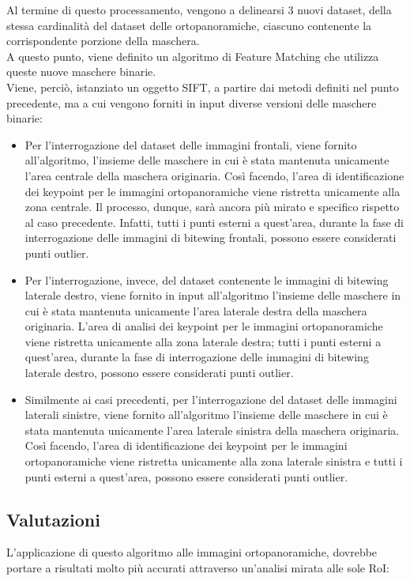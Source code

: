 \documentclass[12pt,a4paper,openright,twoside]{book}
\begin{document}
Al termine di questo processamento, vengono a delinearsi 3 nuovi dataset, della stessa cardinalità del dataset delle ortopanoramiche, ciascuno contenente la corrispondente porzione della maschera.\\

A questo punto, viene definito un algoritmo di Feature Matching che utilizza queste nuove maschere binarie.\\
Viene, perciò, istanziato un oggetto SIFT, a partire dai metodi definiti nel punto precedente, ma a cui vengono forniti in input diverse versioni delle maschere binarie:
\begin{itemize}
\item Per l'interrogazione del dataset delle immagini frontali, viene fornito all'algoritmo, l'insieme delle maschere in cui è stata mantenuta unicamente l'area centrale della maschera originaria. Così facendo, l'area di identificazione dei keypoint per le immagini ortopanoramiche viene ristretta unicamente alla zona centrale. Il processo, dunque, sarà ancora più mirato e specifico rispetto al caso precedente. Infatti, tutti i punti esterni a quest'area, durante la fase di interrogazione delle immagini di bitewing frontali, possono essere considerati punti outlier.
\item  Per l'interrogazione, invece, del dataset contenente le immagini di bitewing laterale destro, viene fornito in input all'algoritmo l'insieme delle maschere in cui è stata mantenuta unicamente l'area laterale destra della maschera originaria. L'area di analisi dei keypoint per le immagini ortopanoramiche viene ristretta unicamente alla zona laterale destra; tutti i punti esterni a quest'area, durante la fase di interrogazione delle immagini di bitewing laterale destro, possono essere considerati punti outlier.
\item Similmente ai casi precedenti, per l'interrogazione del dataset delle immagini laterali sinistre, viene fornito all'algoritmo l'insieme delle maschere in cui è stata mantenuta unicamente l'area laterale sinistra della maschera originaria. Così facendo, l'area di identificazione dei keypoint per le immagini ortopanoramiche viene ristretta unicamente alla zona laterale sinistra e tutti i punti esterni a quest'area, possono essere considerati punti outlier.
\end{itemize}


\subsection{Valutazioni}
L'applicazione di questo algoritmo alle immagini ortopanoramiche, dovrebbe portare a risultati molto più accurati attraverso un'analisi mirata alle sole RoI:
\end{document}
